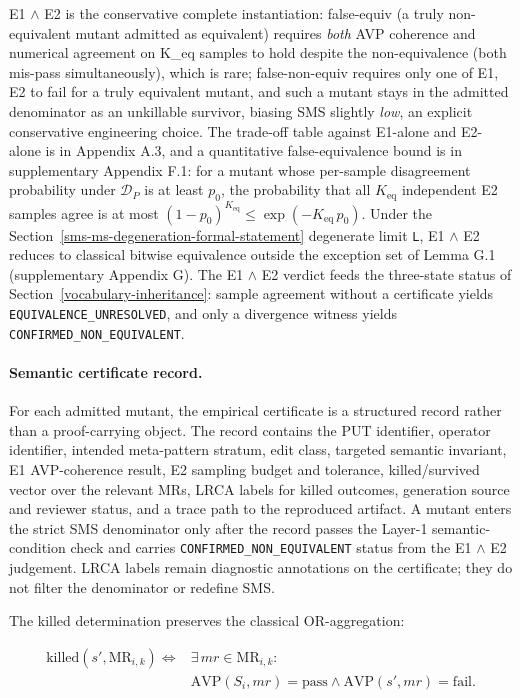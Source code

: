\documentclass[manuscript,screen,review]{acmart}
\begin{document}
E1 $\wedge$ E2 is the conservative complete instantiation: false-equiv (a
truly non-equivalent mutant admitted as equivalent) requires \emph{both}
AVP coherence and numerical agreement on K\_eq samples to hold despite the
non-equivalence (both mis-pass simultaneously), which is rare;
false-non-equiv requires only one of E1, E2 to fail for a truly equivalent
mutant, and such a mutant stays in the admitted denominator as an
unkillable survivor, biasing SMS slightly \emph{low}, an explicit
conservative engineering choice. The trade-off table against
E1-alone and E2-alone is in Appendix A.3, and a quantitative
false-equivalence bound is in supplementary Appendix F.1: for a mutant
whose per-sample disagreement probability under $\mathcal{D}_P$ is at
least $p_0$, the probability that all $K_{\mathrm{eq}}$ independent E2
samples agree is at most
$(1-p_0)^{K_{\mathrm{eq}}} \leq \exp(-K_{\mathrm{eq}}\,p_0)$. Under the
Section~\ref{sms-ms-degeneration-formal-statement} degenerate
limit \texttt{L}, E1 $\wedge$ E2 reduces to classical bitwise
equivalence outside the exception set of Lemma G.1 (supplementary
Appendix G). The E1 $\wedge$ E2 verdict feeds the three-state status of
Section~\ref{vocabulary-inheritance}: sample agreement without a
certificate yields \texttt{EQUIVALENCE\_UNRESOLVED}, and only a
divergence witness yields \texttt{CONFIRMED\_NON\_EQUIVALENT}.

\paragraph{Semantic certificate record.}
For each admitted mutant, the empirical certificate is a structured
record rather than a proof-carrying object. The record contains the PUT
identifier, operator identifier, intended meta-pattern stratum, edit
class, targeted semantic invariant, E1 AVP-coherence result, E2 sampling
budget and tolerance, killed/survived vector over the relevant MRs, LRCA
labels for killed outcomes, generation source and reviewer status, and a
trace path to the reproduced artifact. A mutant enters the strict SMS
denominator only after the record passes the Layer-1 semantic-condition
check and carries \texttt{CONFIRMED\_NON\_EQUIVALENT} status from the
E1 $\wedge$ E2 judgement. LRCA labels remain
diagnostic annotations on the certificate; they do not filter the
denominator or redefine SMS.

The killed determination preserves the classical OR-aggregation:

\[
\begin{aligned}
\mathrm{killed}(s', \mathrm{MR}_{i,k}) \iff{} & \exists\,mr \in \mathrm{MR}_{i,k}: \\
& \mathrm{AVP}(S_i, mr) = \text{pass} \wedge
  \mathrm{AVP}(s', mr) = \text{fail}.
\end{aligned}
\]
\end{document}

